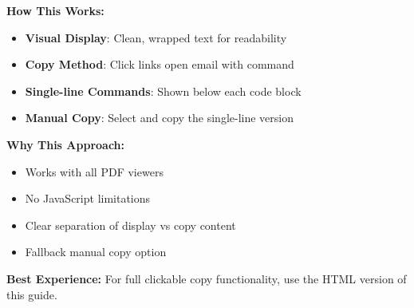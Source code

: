 \documentclass{article}
\begin{document}
\begin{infobox}
\textbf{How This Works:}
\begin{itemize}
    \item \textbf{Visual Display}: Clean, wrapped text for readability
    \item \textbf{Copy Method}: Click links open email with command
    \item \textbf{Single-line Commands}: Shown below each code block
    \item \textbf{Manual Copy}: Select and copy the single-line version
\end{itemize}

\textbf{Why This Approach:}
\begin{itemize}
    \item Works with all PDF viewers
    \item No JavaScript limitations
    \item Clear separation of display vs copy content
    \item Fallback manual copy option
\end{itemize}

\textbf{Best Experience:}
For full clickable copy functionality, use the HTML version of this guide.
\end{infobox}
\end{document}
